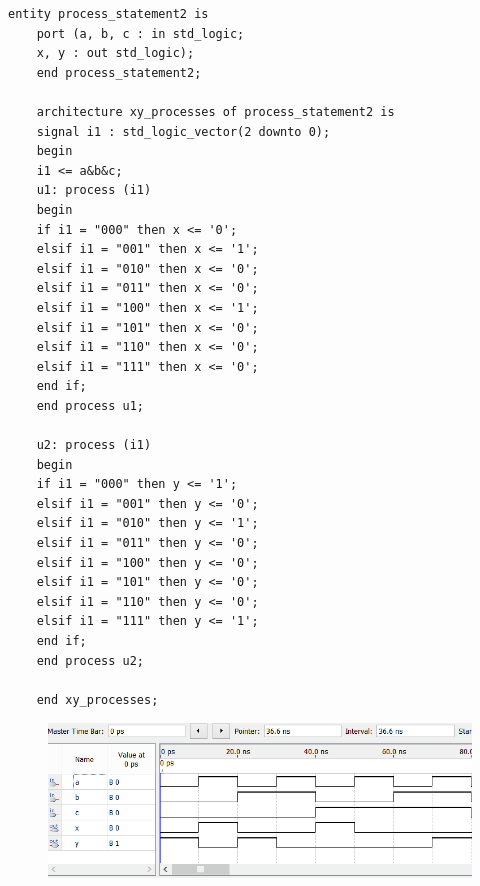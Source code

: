 \begin{enumerate}
\begin{lstlisting}[caption={Behavioral style kode for truth tabellen},label={lst:truthtab}]
	entity process_statement2 is 
	port (a, b, c : in std_logic;
	x, y : out std_logic);
	end process_statement2;
	
	architecture xy_processes of process_statement2 is
	signal i1 : std_logic_vector(2 downto 0);
	begin
	i1 <= a&b&c;
	u1: process (i1)
	begin
	if i1 = "000" then x <= '0';
	elsif i1 = "001" then x <= '1';
	elsif i1 = "010" then x <= '0';
	elsif i1 = "011" then x <= '0';
	elsif i1 = "100" then x <= '1';
	elsif i1 = "101" then x <= '0';
	elsif i1 = "110" then x <= '0';
	elsif i1 = "111" then x <= '0';
	end if;
	end process u1;
	
	u2: process (i1)
	begin
	if i1 = "000" then y <= '1';
	elsif i1 = "001" then y <= '0';
	elsif i1 = "010" then y <= '1';
	elsif i1 = "011" then y <= '0';
	elsif i1 = "100" then y <= '0';
	elsif i1 = "101" then y <= '0';
	elsif i1 = "110" then y <= '0';
	elsif i1 = "111" then y <= '1';
	end if;
	end process u2;
	
	end xy_processes;
	\end{lstlisting}
	\begin{figure}[h]
		\centering
		\includegraphics[scale=0.75]{pictures/Oevelse5/opg1/func_sim_truth.JPG}
		\caption{}
		\label{fig:Functional simulation af Truth tabel.}
	\end{figure}
\end{enumerate}
